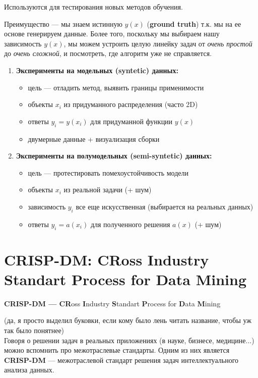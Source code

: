 \documentclass{article}
\begin{document}
Используются для тестирования новых методов обучения.

Преимущество --- мы знаем истинную $y(x)$ (\textbf{ground truth}) т.к. мы на ее основе генерируем данные. Более того, поскольку мы выбираем  нашу зависимость $y(x)$, мы можем устроить целую линейку задач от \textit{очень простой} до \textit{очень сложной}, и посмотреть, где алгоритм уже не справляется.


\begin{enumerate}
\item \textbf{Эксперименты на модельных (syntetic) данных:}

	\begin{itemize}
	\item цель --- отладить метод, выявить границы применимости
	\item объекты $x_i$ из придуманного распределения (часто 2D)
	\item ответы $y_i = y(x_i)$ для придуманной функции $y(x)$
	\item двумерные данные + визуализация сборки
	\end{itemize}
	
\item \textbf{Эксперименты на полумодельных (semi-syntetic) данных:}
	
	\begin{itemize}
	\item цель --- протестировать помехоустойчивость модели
	\item объекты $x_i$ из реальной задачи (+ шум)
	\item зависимость $y_i$ все еще искусственная (выбирается на реальных данных)
	\item ответы $y_i = a(x_i)$ для полученного решения $a(x)$ (+ шум)
	\end{itemize}
\end{enumerate}

\section{CRISP-DM: CRoss Industry Standart Process for Data Mining}

\textbf{CRISP-DM --- CR}oss \textbf{I}ndustry \textbf{S}tandart
\textbf{P}rocess for \textbf{D}ata \textbf{M}ining

(да, я просто выделил буковки, если кому было лень читать название, чтобы уж так было понятнее)
\\

Говоря о решении задач в реальных приложениях (в науке, бизнесе, медицине...) можно вспомнить про межотраслевые стандарты. Одним из них является \textbf{CRISP-DM} --- межотраслевой стандарт решения задач интеллектуального анализа данных.
\end{document}
